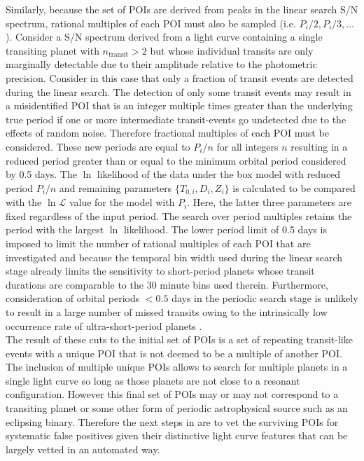 Similarly, because the set of POIs are derived from peaks in the linear search S/N spectrum, 
rational multiples of each POI must also be sampled (i.e. $P_i/2,P_i/3,\dots$).
Consider a S/N spectrum derived from a light curve containing a single transiting planet with
$n_{\text{transit}}>2$ but whose individual transits are only marginally detectable  due to their
amplitude relative to the photometric precision. Consider in this case that only a fraction of
transit events are detected during the linear search.
The detection of only some transit events may result in a misidentified
POI that is an integer multiple times greater than the underlying true period if one or more
intermediate transit-events go undetected due to the effects of random noise.
Therefore fractional multiples of each POI must be considered. These new periods are equal to
$P_i/n$ for all integers $n$ resulting in a reduced period greater than or equal to the minimum
orbital period considered by \pipeline{:} 0.5 days. The $\ln$ likelihood of the data under
the box model with reduced period $P_i/n$ and remaining parameters $\{T_{0,i},D_i,Z_i\}$ is calculated
to be compared with the $\ln{\mathcal{L}}$ value for the model with $P_i$. Here, the latter three parameters
are fixed regardless of the input period. The search over period
multiples retains the period with the largest $\ln$ likelihood.
The lower period limit of 0.5 days is imposed to limit the number of rational multiples of each POI that
are investigated and because the temporal bin width used during the linear search stage already limits
the sensitivity to short-period planets whose transit durations are comparable to the 30 minute bins used
therein. Furthermore, consideration of orbital periods $< 0.5$ days in the periodic search stage is
unlikely to result in a large number of missed transits owing to the intrinsically low occurrence rate of
ultra-short-period planets \citep[$\lesssim 1$\%;][]{sanchisojeda14,adams16}. \\

The result of these cuts to the initial set of POIs is a set of repeating transit-like events
with a unique POI that is not deemed to be a multiple of another POI. The inclusion of multiple
unique POIs allows \pipeline{} to search for multiple planets in a single light curve so long as
those planets are not close to a resonant configuration. However this final set of POIs may or
may not correspond to a transiting planet or some other form of periodic astrophysical source
such as an eclipsing binary. Therefore the next steps in \pipeline{} are to vet the surviving POIs for systematic
false positives given their distinctive light curve features that can be largely
vetted in an automated way. 


